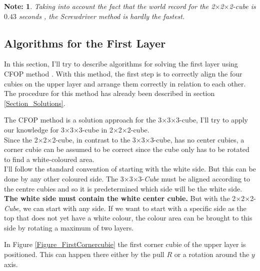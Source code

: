 \documentclass[12pt,a4paper]{article}
\theoremstyle{custom}
\newtheorem*{note}{Note:}
\newcommand{\Ttwo}{2$\times$2$\times$2-}
\newcommand{\Tthree}{3$\times$3$\times$3-}
\begin{document}
\begin{note}
Taking into account the fact that the world record for the \Ttwo cube is $0.43$ seconds \cite{record, HugeCube}, the Screwdriver method is hardly the fastest.
\end{note}

\subsection{Algorithms for the First Layer}
\label{Section_AlgorithmsFirstlayer}
In this section, I'll try to describe algorithms for solving the first layer using CFOP method \cite{fridrich1997,ruwix_advanced_cfop_fridrich}. With this method, the first step is to correctly align the four cubies on the upper layer and arrange them correctly in relation to each other. The procedure for this method has already been described in section \ref{Section_Solutions}.

The CFOP method is a solution approach for the \Tthree cube, I'll try to apply our knowledge for \Tthree cube in  \Ttwo cube.\\
Since the \Ttwo cube, in contrast to the \Tthree cube, has no center cubies, a corner cubie can be assumed to be correct since the cube only has to be rotated to find a white-coloured area.\\
I'll follow the standard convention of starting with the white side. But this can be done by any other coloured side.
The \Tthree \textit{Cube} must be aligned according to the centre cubies and so it is predetermined which side will be the white side. \textbf{The white side must contain the white center cubie.}
But with the \Ttwo \textit{Cube}, we can start with any side. If we want to start with a specific side as the top that does not yet have a white colour, the colour area can be brought to this side by rotating a maximum of two layers.

In Figure \ref{Figure_FirstCornercubie} the first corner cubie of the upper layer is positioned. This can happen there either by the pull $R$ or a rotation around the $y$ axis.
\end{document}
